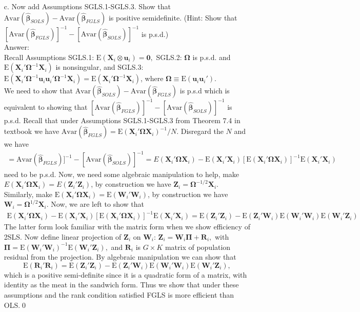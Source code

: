 \documentclass[10pt]{article}
\newcommand{\E}{\text{E}}
\newcommand{\Av}{\text{Avar}}
\begin{document}
\begin{enumerate}
\item[c.] Now add Assumptions SGLS.1-SGLS.3. Show that $\Av(\hat{\pmb{\beta}}_{SOLS})-\Av(\hat{\pmb{\beta}}_{FGLS})$ is positive semidefinite. (Hint: Show that $[\Av(\hat{\pmb{\beta}}_{FGLS})]^{-1}-[\Av(\hat{\pmb{\beta}}_{SOLS})]^{-1}$ is p.s.d.)
\\ Answer:\\
Recall Assumptions SGLS.1: $\E(\textbf{X}_i \otimes \textbf{u}_i)=\textbf{0},$ SGLS.2: $\pmb{\Omega}$ is p.s.d. and $\E(\textbf{X}_i'\pmb{\Omega}^{-1}\textbf{X}_i)$ is nonsingular, and SGLS.3: $\E(\textbf{X}_i'\pmb{\Omega}^{-1}\textbf{u}_i\textbf{u}_i'\pmb{\Omega}^{-1}\textbf{X}_i)=\E(\textbf{X}_i'\pmb{\Omega}^{-1}\textbf{X}_i)$, where $\pmb{\Omega}\equiv \E(\textbf{u}_i\textbf{u}_i').$\\
We need to show that $\Av(\hat{\pmb{\beta}}_{SOLS})-\Av(\hat{\pmb{\beta}}_{FGLS})$ is p.s.d which is equivalent to showing that $[\Av(\hat{\pmb{\beta}}_{FGLS})]^{-1}-[\Av(\hat{\pmb{\beta}}_{SOLS})]^{-1}$ is p.s.d. Recall that under Assumptions SGLS.1-SGLS.3 from Theorem 7.4 in textbook we have $\Av(\hat{\pmb{\beta}}_{FGLS})=\E(\textbf{X}_i'\pmb{\Omega}\textbf{X}_i)^{-1}/N.$ Disregard the $N$ and we have
\begin{align*}=
    \Av(\hat{\pmb{\beta}}_{FGLS})]^{-1}-[\Av(\hat{\pmb{\beta}}_{SOLS})]^{-1}=E(\textbf{X}_i'\pmb{\Omega}\textbf{X}_i)-\E(\textbf{X}_i'\textbf{X}_i)[\E(\textbf{X}_i'\pmb{\Omega}\textbf{X}_i)]^{-1}\E(\textbf{X}_i'\textbf{X}_i)
\end{align*}
need to be p.s.d. Now, we need some algebraic manipulation to help, make $E(\textbf{X}_i'\pmb{\Omega}\textbf{X}_i)=E(\textbf{Z}_i'\textbf{Z}_i)$, by construction we have $\textbf{Z}_i=\pmb{\Omega}^{-1/2}\textbf{X}_i$. Similarly, make $\E(\textbf{X}_i'\pmb{\Omega}\textbf{X}_i)=\E(\textbf{W}_i'\textbf{W}_i)$, by construction we have $\textbf{W}_i=\pmb{\Omega}^{1/2}\textbf{X}_i$. Now, we are left to show that 
\begin{align*}
    \E(\textbf{X}_i'\pmb{\Omega}\textbf{X}_i)-\E(\textbf{X}_i'\textbf{X}_i)[\E(\textbf{X}_i'\pmb{\Omega}\textbf{X}_i)]^{-1}\E(\textbf{X}_i'\textbf{X}_i)=\E(\textbf{Z}_i'\textbf{Z}_i)-\E(\textbf{Z}_i'\textbf{W}_i)\E(\textbf{W}_i'\textbf{W}_i)\E(\textbf{W}_i'\textbf{Z}_i)
\end{align*}
The latter form look familiar with the matrix form when we show efficiency of 2SLS. Now define linear projection of $\textbf{Z}_i$ on $\textbf{W}_i$: $\textbf{Z}_i=\textbf{W}_i\pmb{\Pi}+\textbf{R}_i,$ with $\pmb{\Pi}=\E(\textbf{W}_i'\textbf{W}_i)^{-1}\E(\textbf{W}_i'\textbf{Z}_i),$ and $\textbf{R}_i$ is $G\times K$ matrix of population residual from the projection. By algebraic manipulation we can show that
\[\E(\textbf{R}_i'\textbf{R}_i)=\E(\textbf{Z}_i'\textbf{Z}_i)-\E(\textbf{Z}_i'\textbf{W}_i)\E(\textbf{W}_i'\textbf{W}_i)\E(\textbf{W}_i'\textbf{Z}_i),\]
which is a positive semi-definite since it is a quadratic form of a matrix, with identity as the meat in the sandwich form. Thus we show that under these assumptions and the rank condition satisfied FGLS is more efficient than OLS.\qed


\end{enumerate}
\end{document}
